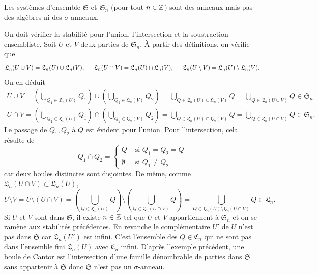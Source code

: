 \begin{prop}
Les systèmes d'ensemble $\mathfrak{S}$ et $\mathfrak{S}_n$ (pour tout $n\in \mathbb{Z}$) sont des anneaux mais pas des algèbres ni des $\sigma$-anneaux.
\end{prop}
\begin{demo}
On doit vérifier la stabilité pour l'union, l'intersection et la soustraction ensembliste. Soit $U$ et $V$ deux parties de $\mathfrak{S}_n$. À partir des définitions, on vérifie que
\begin{displaymath}
 \mathfrak{L}_n(U \cup V ) = \mathfrak{L}_n(U ) \cup \mathfrak{L}_n(V), \hspace{0.5cm}
 \mathfrak{L}_n(U \cap V ) = \mathfrak{L}_n(U ) \cap \mathfrak{L}_n(V), \hspace{0.5cm}
 \mathfrak{L}_n(U \setminus V ) = \mathfrak{L}_n(U ) \setminus \mathfrak{L}_n(V).
\end{displaymath}
On en déduit
\begin{align*}
 U \cup V   = \left(\bigcup_{Q_1 \in \mathfrak{L}_n(U)}Q_1\right) \cup \left(\bigcup_{Q_2 \in \mathfrak{L}_n(V)}Q_2\right)
            = \bigcup_{Q \in \mathfrak{L}_n(U) \cup \mathfrak{L}_n(V)}Q = \bigcup_{Q \in \mathfrak{L}_n(U \cup V )}Q \in \mathfrak{S}_n \\
 U \cap V   = \left(\bigcup_{Q_1 \in \mathfrak{L}_n(U)}Q_1\right) \cap \left(\bigcup_{Q_2 \in \mathfrak{L}_n(V)}Q_2\right)
            = \bigcup_{Q \in \mathfrak{L}_n(U) \cap \mathfrak{L}_n(V)}Q = \bigcup_{Q \in \mathfrak{L}_n(U \cap V )}Q \in \mathfrak{S}_n.
\end{align*}
Le passage de $Q_1, Q_2$ à $Q$ est évident pour l'union. Pour l'intersection, cela résulte de
\begin{displaymath}
 Q_1 \cap Q_2 =
 \left\lbrace
   \begin{aligned}
    Q &\text{ si } Q_1 = Q_2 = Q \\
    \emptyset &\text{ si } Q_1 \neq Q_2
   \end{aligned}
  \right.
\end{displaymath}
car deux boules distinctes sont disjointes. De même, comme $\mathfrak{L}_n(U \cap V ) \subset \mathfrak{L}_n(U)$,
\begin{displaymath}
 U \setminus V = U \setminus (U \cap V) = \left(\bigcup_{Q \in \mathfrak{L}_n(U)}Q\right) \setminus \left(\bigcup_{Q \in \mathfrak{L}_n(U \cap V) }Q\right)
 = \bigcup_{Q \in \mathfrak{L}_n(U) \setminus \mathfrak{L}_n(U \cap V) }Q
 \in \mathfrak{L}_n.
\end{displaymath}
Si $U$ et $V$ sont dans $\mathfrak{S}$, il existe $n\in \mathbb{Z}$ tel que $U$ et $V$ appartiennent à $\mathfrak{S}_n$ et on se ramène aux stabilités précédentes.\newline
En revanche le complémentaire $U'$ de $U$ n'est pas dans $\mathfrak{S}$ car $\mathfrak{L}_n(U')$ est infini. C'est l'ensemble des $Q \in \mathfrak{C}_n$ qui ne sont pas dans l'ensemble fini $\mathfrak{L}_n(U)$ avec $\mathfrak{C}_n$ infini.\newline
D'après l'exemple précédent, une boule de Cantor est l'intersection d'une famille dénombrable de parties dans $\mathfrak{S}$ sans appartenir à $\mathfrak{S}$ donc $\mathfrak{S}$ n'est pas un $\sigma$-anneau.
\end{demo}

